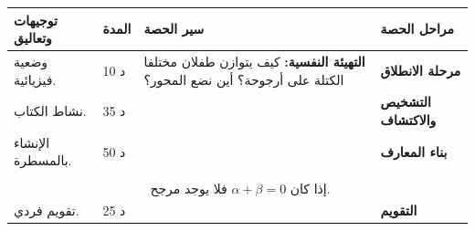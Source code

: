 \documentclass[12pt,a4paper]{article}
\newenvironment{LTR}{\begin{otherlanguage}{english}}{\end{otherlanguage}}
\newcommand{\ar}[1]{\foreignlanguage{arabic}{#1}}
\newcommand{\Phase}[1]{\textbf{#1}}
\newenvironment{Sayr}{%
\begin{LTR}\renewcommand{\arraystretch}{1.25}
\begin{longtable}{|p{0.17\textwidth}|>{\centering\arraybackslash}p{0.06\textwidth}|p{0.53\textwidth}|>{\centering\arraybackslash}p{0.12\textwidth}|}
\hline\rowcolor{cThm!12}\ar{\textbf{توجيهات وتعاليق}} & \ar{\textbf{المدة}} & \ar{\textbf{سير الحصة}} & \ar{\textbf{مراحل الحصة}}\\\hline\endhead
\hline\endfoot}{\end{longtable}\end{LTR}}
\newcommand{\Row}[4]{\ar{\small #4} & \ar{#3} & \ar{#2} & \cellcolor{cThm!8}\ar{\Phase{#1}}\\\hline}
\newcommand{\Lab}[2]{\foreignlanguage{english}{\tcbox[on line,colback=#1,colframe=#1,boxrule=0pt,arc=2pt,boxsep=1pt,left=5pt,right=5pt,top=1pt,bottom=1pt]{\ar{\textcolor{white}{\textbf{#2}}}}}}
\newcommand{\ck}{\ensuremath{{\color{cRem}\checkmark}}}
\begin{document}
\begin{Sayr}
\Row{مرحلة الانطلاق}{%
\textbf{التهيئة النفسية:} كيف يتوازن طفلان مختلفا الكتلة على أرجوحة؟ أين نضع المحور؟}{10 د}{وضعية فيزيائية.}
\Row{التشخيص والاكتشاف}{%
\Lab{cEx}{مناقشة نشاط 01 (أنشطة باب المرجح)}\par\ck\ قانون أرخميدس: التوازن يتحقق إذا كان $m_1\times GA=m_2\times GB$.\par
\ck\ شعاعياً: $m_1\overrightarrow{GA}+m_2\overrightarrow{GB}=\vec0$ ؛ النقطة $G$ نقطة توازن $A$ و $B$ المرفقتين بالكتلتين.\par
}{35 د}{نشاط الكتاب.}
\Row{بناء المعارف}{%
\Lab{cDef}{تعريف}\ $\alpha+\beta\neq0$: توجد نقطة وحيدة $G$ حيث $\alpha\overrightarrow{GA}+\beta\overrightarrow{GB}=\vec0$ ، نسميها \textbf{مرجح} الجملة $\{(A;\alpha),(B;\beta)\}$.\par\Lab{cThm}{الإنشاء}\ $\overrightarrow{AG}=\dfrac\beta{\alpha+\beta}\overrightarrow{AB}$ ، و $G\in(AB)$.\par}{50 د}{الإنشاء بالمسطرة.}
\Row{}{%
\Lab{cEx}{مثال}\ مرجح $\{(A;2),(B;1)\}$: $\overrightarrow{AG}=\frac13\overrightarrow{AB}$.\par\smallskip\begin{LTR}\centering \begin{tikzpicture}[x=1cm,font=\scriptsize]
\draw[thick] (0,0)--(6,0);
\foreach \x/\n/\w in {0/A/2,6/B/1} {\fill (\x,0) circle (1.6pt); \node[below] at (\x,0){$(\n;\w)$};}
\fill[cThm] (2,0) circle (2pt) node[above]{$G$};
\draw[<->,cDef] (0,0.35)--(2,0.35) node[midway,above]{$\frac13AB$};
\end{tikzpicture}\end{LTR}\par \Lab{cThm}{خواص}\par\ck\ لا يتغير المرجح إذا ضربنا المعاملين في نفس العدد غير المعدوم.\par
\ck\ مرجح $\{(A;1),(B;1)\}$ هو منتصف $[AB]$.\par
\ck\ من أجل كل نقطة $M$: $\alpha\overrightarrow{MA}+\beta\overrightarrow{MB}=(\alpha+\beta)\overrightarrow{MG}$.\par
}{}{}
\Row{}{%
\Lab{cThm!80!black}{حذار}\ إذا كان $\alpha+\beta=0$ فلا يوجد مرجح.}{}{}
\Row{التقويم}{%
\Lab{cEx}{تطبيق}\par أنشئ $G$ مرجح $\{(A;3),(B;-1)\}$ و $H$ مرجح $\{(A;1),(B;3)\}$.\par\textbf{الحل:} $\overrightarrow{AG}=\dfrac{-1}{2}\overrightarrow{AB}$ ($G$ خارج $[AB]$ من جهة $A$) ؛ $\overrightarrow{AH}=\dfrac34\overrightarrow{AB}$.\par\textbf{واجب منزلي:} تمارين 18 إلى 28 من باب المرجح.\par\smallskip\textbf{ملاحظات حول سير الحصة:} \dotfill}{25 د}{تقويم فردي.}
\end{Sayr}
\end{document}
